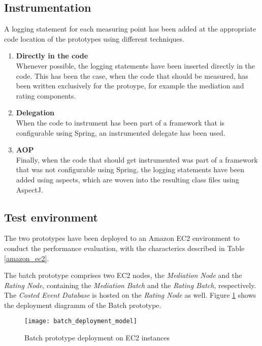 \subsection{Instrumentation}
A logging statement for each measuring point has been added at the appropriate code location of the prototypes using different techniques.

\begin{enumerate}
	\item \textbf{Directly in the code}\\Whenever possible, the logging statements have been inserted directly in the code. This has been the case, when the code that should be measured, has been written exclusively for the protoype, for example the mediation and rating components.
	\item \textbf{Delegation}\\When the code to instrument has been part of a framework that is configurable using Spring, an instrumented delegate has been used.
	\item \textbf{AOP}\\Finally, when the code that should get instrumented was part of a framework that was not configurable using Spring, the logging statements have been added using aspects, which are woven into the resulting class files using AspectJ.
\end{enumerate}

\subsection{Test environment}

The two prototypes have been deployed to an Amazon EC2 environment to conduct the performance evaluation, with the characterics described in Table \ref{amazon_ec2}.

The batch prototype comprises two EC2 nodes, the \emph{Mediation Node} and the \emph{Rating Node}, containing the \emph{Mediation Batch} and the \emph{Rating Batch}, respectively. The \emph{Costed Event Database} is hosted on the \emph{Rating Node} as well. Figure \ref{fig:batch_deployment_model} shows the deployment diagramm of the Batch prototype.

\begin{figure}[htbp]
	\centering
	\texttt{[image: batch\_deployment\_model]}
	\caption{Batch prototype deployment on EC2 instances}
	\label{fig:batch_deployment_model}
\end{figure}

